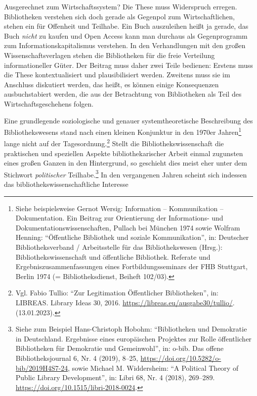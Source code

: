 \documentclass[a4paper,
fontsize=11pt,
oneside,
numbers=noperiodatend,
parskip=half-,
bibliography=totoc,
final
]{scrartcl}
\begin{document}
Ausgerechnet zum Wirtschaftssystem? Die These muss Widerspruch erregen.
Bibliotheken verstehen sich doch gerade als Gegenpol zum
Wirtschaftlichen, stehen ein für Offenheit und Teilhabe. Ein Buch
auszuleihen heißt ja gerade, das Buch \emph{nicht} zu kaufen und Open
Access kann man durchaus als Gegenprogramm zum Informationskapitalismus
verstehen. In den Verhandlungen mit den großen Wissenschaftsverlagen
stehen die Bibliotheken für die freie Verteilung informationeller Güter.
Der Beitrag muss daher zwei Teile bedienen: Erstens muss die These
kontextualisiert und plausibilisiert werden. Zweitens muss sie im
Anschluss diskutiert werden, das heißt, es können einige Konsequenzen
ausbuchstabiert werden, die aus der Betrachtung von Bibliotheken als
Teil des Wirtschaftsgeschehens folgen.

Eine grundlegende soziologische und genauer systemtheoretische
Beschreibung des Bibliothekswesens stand nach einen kleinen Konjunktur
in den 1970er Jahren\footnote{Siehe beispielsweise Gernot Wersig:
  Information -- Kommunikation -- Dokumentation. Ein Beitrag zur
  Orientierung der Informations- und Dokumentationswissenschaften,
  Pullach bei München 1974 sowie Wolfram Henning: \enquote{Öffentliche
  Bibliothek und soziale Kommunikation}, in: Deutscher
  Bibliotheksverband / Arbeitsstelle für das Bibliothekswesen (Hrsg.):
  Bibliothekswissenschaft und öffentliche Bibliothek. Referate und
  Ergebniszusammenfassungen eines Fortbildungsseminars der FHB
  Stuttgart, Berlin 1974 (= Bibliotheksdienst, Beiheft 102/03).} lange
nicht auf der Tagesordnung.\footnote{Vgl. Fabio Tullio: \enquote{Zur
  Legitimation Öffentlicher Bibliotheken}, in: LIBREAS. Library Ideas
  30, 2016. \url{https://libreas.eu/ausgabe30/tullio/}. (13.01.2023).}
Stellt die Bibliothekswissenschaft die praktischen und speziellen
Aspekte bibliothekarischer Arbeit einmal zugunsten eines großen Ganzen
in den Hintergrund, so geschieht dies meist eher unter dem Stichwort
\emph{politischer} Teilhabe.\footnote{Siehe zum Beispiel Hans-Christoph
  Hobohm: \enquote{Bibliotheken und Demokratie in Deutschland.
  Ergebnisse eines europäischen Projektes zur Rolle öffentlicher
  Bibliotheken für Demokratie und Gemeinwohl}, in: o-bib. Das offene
  Bibliotheksjournal 6, Nr. 4 (2019), 8--25,
  \url{https://doi.org/10.5282/o-bib/2019H4S7-24}, sowie Michael M.
  Widdersheim: \enquote{A Political Theory of Public Library
  Development}, in: Libri 68, Nr. 4 (2018), 269--289.
  \url{https://doi.org/10.1515/libri-2018-0024}.} In den vergangenen
Jahren scheint sich indessen das bibliothekswissenschaftliche Interesse
\end{document}
